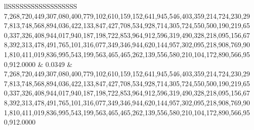 \begin{table}
\begin{tabular}{llSSSSSSSSSSSSSSSSSS}
7,268,720,449,307,080,400,779,102,610,159,152,641,945,546,403,359,214,724,230,297,813,748,568,894,036,422,133,847,427,708,534,928,714,305,724,550,500,190,219,650,337,326,408,944,017,940,187,198,722,853,964,912,596,319,490,328,218,095,156,678,392,313,478,491,765,101,316,077,349,346,944,620,144,957,302,095,218,908,769,901,810,411,019,836,995,543,199,563,465,465,262,139,556,580,210,104,172,890,566,950,912.0000 & 0.0349 & 7,268,720,449,307,080,400,779,102,610,159,152,641,945,546,403,359,214,724,230,297,813,748,568,894,036,422,133,847,427,708,534,928,714,305,724,550,500,190,219,650,337,326,408,944,017,940,187,198,722,853,964,912,596,319,490,328,218,095,156,678,392,313,478,491,765,101,316,077,349,346,944,620,144,957,302,095,218,908,769,901,810,411,019,836,995,543,199,563,465,465,262,139,556,580,210,104,172,890,566,950,912.0000 \\

\end{tabular}
\end{table}
